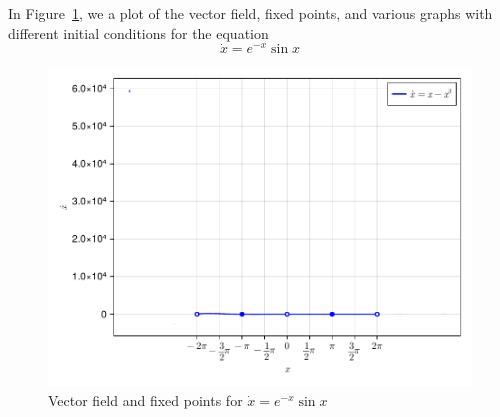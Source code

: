 
In Figure~\ref{fig2_2_4vecfield}, we a plot of the vector field, fixed points,
and various graphs with different initial conditions for the equation 
\[
    \dot{x} = e^{-x}\sin{x}
\]
\begin{figure}[!ht]
    \includegraphics[scale=0.6, center]{../plots/ch02/ex2_2_4.pdf}
    \caption{Vector field and fixed points for $\dot{x} = e^{-x}\sin{x}$
        \label{fig2_2_4vecfield}}
\end{figure}

